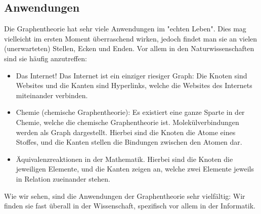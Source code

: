 \documentclass{article}
\begin{document}
\subsection{Anwendungen}
Die Graphentheorie hat sehr viele Anwendungen im "echten Leben". Dies mag vielleicht im ersten Moment überraschend wirken, jedoch findet man sie an vielen (unerwarteten) Stellen, Ecken und Enden. Vor allem in den Naturwissenschaften sind sie häufig anzutreffen:\\
\begin{itemize}
	\item{Das Internet! Das Internet ist ein einziger riesiger Graph: Die Knoten sind Websites und die Kanten sind Hyperlinks, welche die Websites des Internets miteinander verbinden.}
	\item{Chemie (chemische Graphentheorie): Es existiert eine ganze Sparte in der Chemie, welche die chemische Graphentheorie ist. Molekülverbindungen werden als Graph dargestellt. Hierbei sind die Knoten die Atome eines Stoffes, und die Kanten stellen die Bindungen zwischen den Atomen dar.}
	\item{Äquivalenzreaktionen in der Mathematik. Hierbei sind die Knoten die jeweiligen Elemente, und die Kanten zeigen an, welche zwei Elemente jeweils in Relation zueinander stehen.}
\end{itemize}
Wie wir sehen, sind die Anwendungen der Graphentheorie sehr vielfältig: Wir finden sie fast überall in der Wissenschaft, spezifisch vor allem in der Informatik.\\
\end{document}
